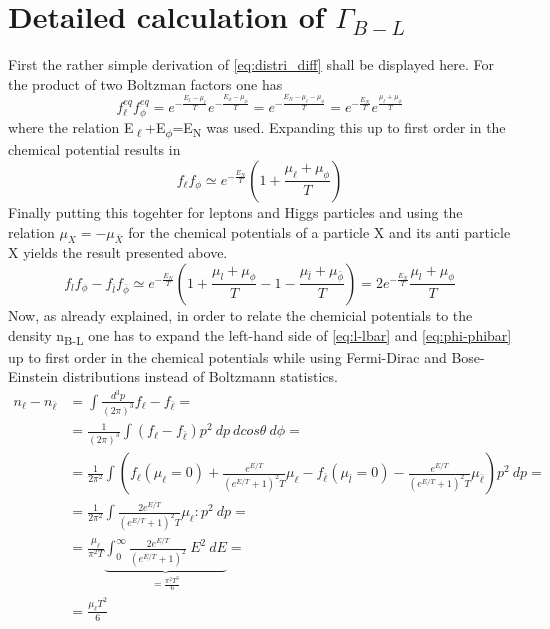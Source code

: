 \section{Detailed calculation of $\Gamma_{B-L}$}
\label{ap:Gamma_B-L}
First the rather simple derivation of \ref{eq:distri_diff} shall be displayed here. For the product of two Boltzman factors one has
\begin{equation*}
f_\ell^{eq}f_\phi^{eq}=e^{-\frac{E_\ell-\mu_\ell}{T}}e^{-\frac{E_\phi-\mu_\phi}{T}}=e^{-\frac{E_N-\mu_\ell-\mu_\phi}{T}}=e^{-\frac{E_N}{T}}e^{\frac{\mu_\ell+\mu_\phi}{T}}
\end{equation*}
where the relation E\textsubscript{$\ell$}+E\textsubscript{$\phi$}=E\textsubscript{N} was used. \newline
Expanding this up to first order in the chemical potential results in
\begin{equation*}
f_\ell f_\phi\simeq e^{-\frac{E_N}{T}}\left(1+\frac{\mu_\ell+\mu_\phi}{T}\right)
\end{equation*}
Finally putting this togehter for leptons and Higgs particles and using the relation $\mu_X=-\mu_{\bar{X}}$ for the chemical potentials of a particle X and its anti particle X yields the result presented above. 
\begin{equation*}
f_lf_\phi-f_{\bar{l}}f_{\bar{\phi}}\simeq e^{-\frac{E_N}{T}}\left(1+\frac{\mu_l+\mu_\phi}{T}-1-\frac{\mu_{\bar{l}}+\mu_{\bar{\phi}}}{T}\right)=2e^{-\frac{E_N}{T}}\frac{\mu_l+\mu_\phi}{T}
\end{equation*}
\newline
Now, as already explained, in order to relate the chemicial potentials to the density n\textsubscript{B-L} one has to expand the left-hand side of \ref{eq:l-lbar} and \ref{eq:phi-phibar} up to first order in the chemical potentials while using Fermi-Dirac and Bose-Einstein distributions instead of Boltzmann statistics.
\begin{align*}
	n_\ell-n_{\bar{\ell}}&=\int\frac{d^3p}{\left(2\pi\right)^3}f_\ell-f_{\bar{\ell}}=\\
	&=\frac{1}{\left(2\pi\right)^3}\int \left(f_\ell-f_{\bar{\ell}}\right)p^2\:dp\:dcos\theta \:d\phi=\\
	&=\frac{1}{2\pi^2}\int\left(f_\ell\left(\mu_\ell=0\right)+\frac{e^{E/T}}{\left(e^{E/T}+1\right)^2T}\mu_\ell-f_{\bar{\ell}}\left(\mu_{\bar{l}}=0\right)-\frac{e^{E/T}}{\left(e^{E/T}+1\right)^2T}\mu_{\bar{\ell}}\right)p^2\:dp=\\
	&=\frac{1}{2\pi^2}\int\frac{2e^{E/T}}{\left(e^{E/T}+1\right)^2T}\mu_\ell:p^2\:dp=\\
	&=\frac{\mu_\ell}{\pi^2T}\underbrace{\int_{0}^{\infty}\frac{2e^{E/T}}{\left(e^{E/T}+1\right)^2}\:E^2\:dE}_{=\frac{\pi^2T^3}{6}}=\\
	&=\frac{\mu_\ell T^2}{6}
\end{align*}
